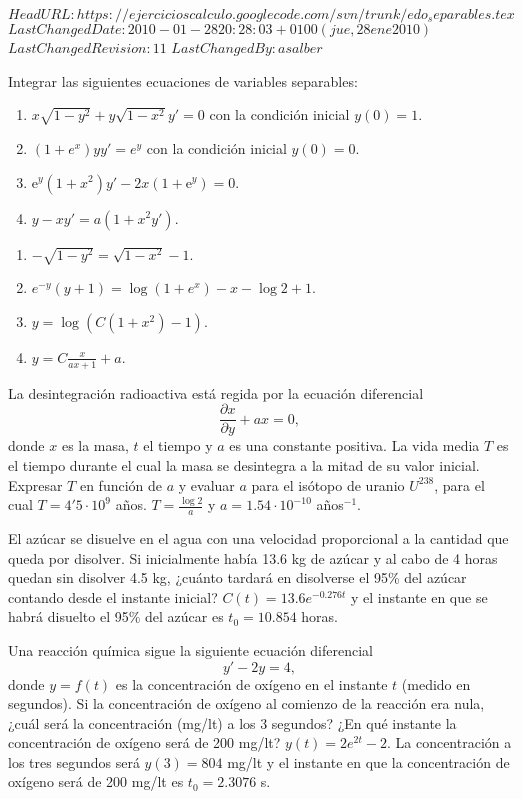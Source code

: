 \svnidlong
{$HeadURL: https://ejercicioscalculo.googlecode.com/svn/trunk/edo_separables.tex $}
{$LastChangedDate: 2010-01-28 20:28:03 +0100 (jue, 28 ene 2010) $}
{$LastChangedRevision: 11 $}
{$LastChangedBy: asalber $}
%
{Integrar las siguientes ecuaciones de variables separables:
\begin{enumerate}
\item $x\sqrt{1-y^2}+y\sqrt{1-x^2}y'=0$ con la condición inicial $y(0)=1$.
\item $(1+e^x)yy'=e^y$ con la condición inicial $y(0)=0$.
\item e$^y(1+x^2)y'-2x(1+\mbox{e}^y)=0$.
\item $y-xy'=a(1+x^2y')$.
\end{enumerate}
}
{
\begin{enumerate}
\item $-\sqrt{1-y^2}=\sqrt{1-x^2}-1$.
\item $e^{-y}(y+1)=\log(1+e^x)-x-\log 2+1$.
\item $y=\log(C(1+x^2)-1)$.
\item $y=C\frac{x}{ax+1}+a$.
\end{enumerate}
}
{}


{La desintegración radioactiva está regida por la ecuación
diferencial
\[
\frac{\partial x}{\partial y}+ax=0,
\]
donde $x$ es la masa, $t$ el tiempo y $a$ es una constante positiva. La vida media $T$ es el tiempo durante el cual la
masa se desintegra a la mitad de su valor inicial. Expresar $T$ en función de $a$ y evaluar $a$ para el isótopo de
uranio $U^{238}$, para el cual $T=4'5\cdot10^9$ años. } 
{$T = \frac{\log 2}{a}$ y $a=1.54\cdot 10^{-10}$ años$^{-1}$.
}
{}



{El azúcar se disuelve en el agua con una velocidad proporcional a la cantidad que queda por disolver. Si inicialmente
había 13.6 kg de azúcar y al cabo de 4 horas quedan sin disolver 4.5 kg, ¿cuánto tardará en disolverse el 95\% del
azúcar contando desde el instante inicial? }
{$C(t)= 13.6e^{-0.276 t}$ y el instante en que se habrá disuelto el 95\% del azúcar es $t_0=10.854$ horas.
}
{}



{Una reacción química sigue la siguiente ecuación diferencial
\[
y'-2y=4,
\]
donde $y=f(t)$ es la concentración de oxígeno en el instante $t$ (medido en segundos). Si la concentración de oxígeno
al comienzo de la reacción era nula, ¿cuál será la concentración (mg/lt) a los 3 segundos? ¿En qué instante la
concentración de oxígeno será de 200 mg/lt?}
{$y(t)=2e^{2t}-2$. La concentración a los tres segundos será $y(3)=804$ mg/lt y el instante en que la concentración de
oxígeno será de 200 mg/lt es $t_0=2.3076$ s.}
{}



